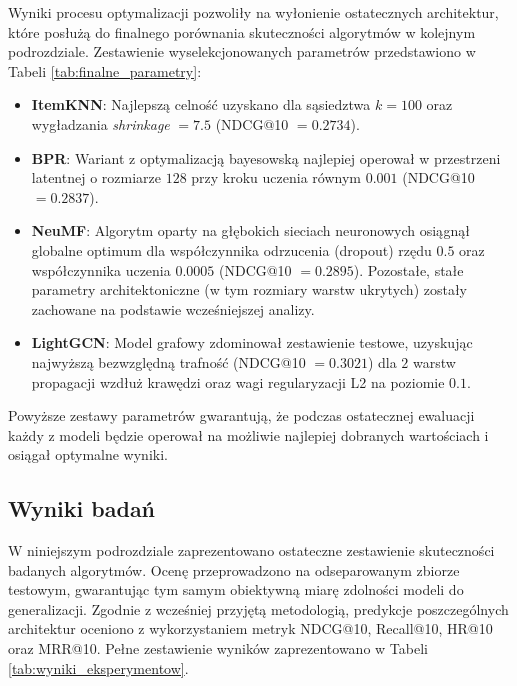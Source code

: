 Wyniki procesu optymalizacji pozwoliły na wyłonienie ostatecznych architektur, które posłużą do finalnego porównania skuteczności algorytmów w kolejnym podrozdziale. Zestawienie wyselekcjonowanych parametrów przedstawiono w Tabeli \ref{tab:finalne_parametry}:
\begin{itemize}
    \item \textbf{ItemKNN}: Najlepszą celność uzyskano dla sąsiedztwa $k=100$ oraz wygładzania \textit{shrinkage} $= 7.5$ (NDCG@10 $= 0.2734$).
    \item \textbf{BPR}: Wariant z optymalizacją bayesowską najlepiej operował w przestrzeni latentnej o rozmiarze $128$ przy kroku uczenia równym $0.001$ (NDCG@10 $= 0.2837$).
    \item \textbf{NeuMF}: Algorytm oparty na głębokich sieciach neuronowych osiągnął globalne optimum dla współczynnika odrzucenia (dropout) rzędu $0.5$ oraz współczynnika uczenia $0.0005$ (NDCG@10 $= 0.2895$). Pozostałe, stałe parametry architektoniczne (w tym rozmiary warstw ukrytych) zostały zachowane na podstawie wcześniejszej analizy.
    \item \textbf{LightGCN}: Model grafowy zdominował zestawienie testowe, uzyskując najwyższą bezwzględną trafność (NDCG@10 $= 0.3021$) dla $2$ warstw propagacji wzdłuż krawędzi oraz wagi regularyzacji L2 na poziomie $0.1$.
\end{itemize}

Powyższe zestawy parametrów gwarantują, że podczas ostatecznej ewaluacji każdy z modeli będzie operował na możliwie najlepiej dobranych wartościach i osiągał optymalne wyniki.

\begin{table}[H]
    \centering
    \caption{Wyselekcjonowane, optymalne wartości hiperparametrów dla badanych modeli}
    \label{tab:finalne_parametry}
    

    \vspace{0.2cm}
\end{table}

\subsection{Wyniki badań}

W niniejszym podrozdziale zaprezentowano ostateczne zestawienie skuteczności badanych algorytmów. Ocenę przeprowadzono na odseparowanym zbiorze testowym, gwarantując tym samym obiektywną miarę zdolności modeli do generalizacji. Zgodnie z wcześniej przyjętą metodologią, predykcje poszczególnych architektur oceniono z wykorzystaniem metryk NDCG@10, Recall@10, HR@10 oraz MRR@10. Pełne zestawienie wyników zaprezentowano w Tabeli \ref{tab:wyniki_eksperymentow}.

